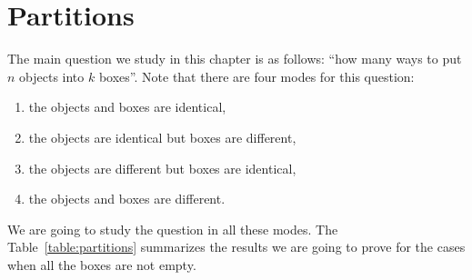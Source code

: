\chapter{Partitions}
\label{chapter:partitions}
The main question we study in this chapter is as follows:
``how many ways to put $n$ objects into $k$ boxes''.
Note that there are four modes for this question:
\begin{enumerate}
  \item the objects and boxes are identical,
  \item the objects are identical but boxes are different,
  \item the objects are different but boxes are identical,
  \item the objects and boxes are different.
\end{enumerate}
We are going to study the question in all these modes.
The Table~\ref{table:partitions} summarizes the results we are going
to prove for the cases when all the boxes are not empty.
